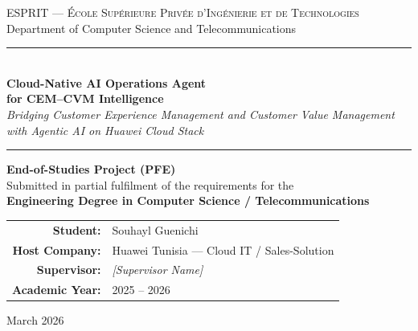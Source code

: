
\begin{titlepage}
\begin{center}

\vspace*{0.5cm}


{\large\textsc{ESPRIT --- École Supérieure Privée d'Ingénierie et de Technologies}}\\[4pt]
{\small Department of Computer Science and Telecommunications}

\vspace{1.5cm}

\rule{\linewidth}{0.8pt}\\[0.6cm]
{\LARGE\bfseries Cloud-Native AI Operations Agent\\[6pt]
for CEM--CVM Intelligence}\\[0.3cm]
{\large\itshape Bridging Customer Experience Management and Customer Value Management\\
with Agentic AI on Huawei Cloud Stack}\\[0.4cm]
\rule{\linewidth}{0.8pt}

\vspace{1.5cm}

{\large\textbf{End-of-Studies Project (PFE)}\\[4pt]
Submitted in partial fulfilment of the requirements for the\\
\textbf{Engineering Degree in Computer Science / Telecommunications}}

\vspace{1.5cm}

\begin{tabular}{rl}
\textbf{Student:}     & Souhayl Guenichi \\[4pt]
\textbf{Host Company:}& Huawei Tunisia --- Cloud IT / Sales-Solution \\[4pt]
\textbf{Supervisor:}  & \textit{[Supervisor Name]} \\[4pt]
\textbf{Academic Year:}& 2025 -- 2026 \\
\end{tabular}

\vfill

{\small March 2026}

\end{center}
\end{titlepage}

